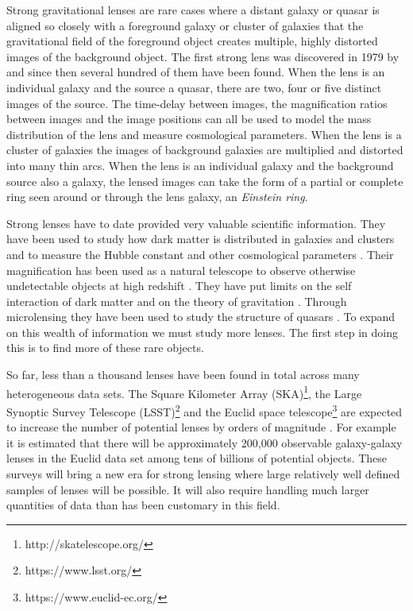 \documentclass{aa}
\begin{document}
Strong gravitational lenses are rare cases where a distant galaxy or quasar is aligned so closely with a foreground galaxy or cluster of galaxies  that the gravitational field of the foreground object creates multiple, highly distorted images of the background object.   The first strong lens was discovered in 1979 by \citet{1979Natur.279..381W} and since then several hundred of them have been found.
When the lens is an individual galaxy and the source a quasar, there are two, four or five distinct images of the source.  The time-delay between images,  the magnification ratios between images and the image positions can all be used to model the mass distribution of the lens and measure cosmological parameters.  When the lens is a cluster of galaxies the images of background galaxies are multiplied and distorted into many thin arcs.   When the lens is an individual galaxy and the background source also a galaxy, the lensed images can take the form of a partial or complete ring seen around or through the lens galaxy, an {\it Einstein ring}.   

Strong lenses have to date provided very valuable scientific information.  They have been used to study how dark matter is distributed in galaxies and clusters \citep[e.g.][]{1991ApJ...373..354K,2001ApJ...554.1216C,2002ApJ...568L...5K,2003ApJ...587..143R,2003ApJ...583..606K,2005MNRAS.360.1333W,2005ApJ...623...31D,2009MNRAS.392..945V,2016MNRAS.463.3115T} and  to measure the Hubble constant and other cosmological parameters 
\citep[e.g.][]{1964MNRAS.128..307R,1992ARAandA..30..311B,2000ApJ...544...98W,2013ApJ...766...70S,2016AandARv..24...11T}.  
Their magnification has been used as a natural telescope to observe otherwise undetectable objects at high redshift \citep[e.g][]{2007ApJ...671.1196M,2017MNRAS.464.4823B,2016ApJ...833..264S}.   They have put limits on the self interaction of dark matter and on the theory of gravitation \citep{0004-637X-606-2-819}.  Through microlensing they have been used to study the structure of quasars \citep{2008ApJ...689..755M,2008ApJ...673...34P,2011ApJ...729...34B}.   To expand on this wealth of information we must study more lenses.  The first step in doing this is to find more of these rare objects.

So far, less than a thousand lenses have been found in total across many heterogeneous data sets.
The Square Kilometer Array (SKA)\footnote{http://skatelescope.org/}, the Large Synoptic Survey Telescope (LSST)\footnote{https://www.lsst.org/} and the Euclid space telescope\footnote{https://www.euclid-ec.org/} are expected to increase the number of potential lenses by orders of magnitude \citep{2010MNRAS.405.2579O,collett_15,euclidSLWGwhitepaper,2015aska.confE..84M}.   For example it is estimated that there will be approximately 200,000 observable galaxy-galaxy lenses in the Euclid data set among tens of billions of potential objects.   These surveys will bring a new era for strong lensing where large relatively well defined samples of lenses will be possible.  It will also require handling much larger quantities of data than has been customary in this field.
\end{document}
